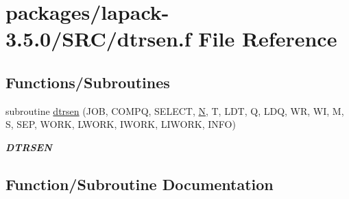 \hypertarget{dtrsen_8f}{}\section{packages/lapack-\/3.5.0/\+S\+R\+C/dtrsen.f File Reference}
\label{dtrsen_8f}
\subsection*{Functions/\+Subroutines}
\begin{DoxyCompactItemize}
\item 
subroutine \hyperlink{dtrsen_8f_afe383d8eb4c3815d8946a5e24ba1899a}{dtrsen} (J\+O\+B, C\+O\+M\+P\+Q, S\+E\+L\+E\+C\+T, \hyperlink{polmisc_8c_a0240ac851181b84ac374872dc5434ee4}{N}, T, L\+D\+T, Q, L\+D\+Q, W\+R, W\+I, M, S, S\+E\+P, W\+O\+R\+K, L\+W\+O\+R\+K, I\+W\+O\+R\+K, L\+I\+W\+O\+R\+K, I\+N\+F\+O)
\begin{DoxyCompactList}\small\item\em {\bfseries D\+T\+R\+S\+E\+N} \end{DoxyCompactList}\end{DoxyCompactItemize}


\subsection{Function/\+Subroutine Documentation}
\hypertarget{dtrsen_8f_afe383d8eb4c3815d8946a5e24ba1899a}{}
